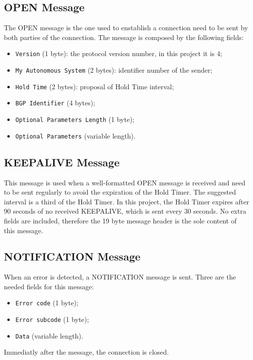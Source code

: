 \subsection{OPEN Message}
The OPEN message is the one used to enstablish a connection need to be sent by both parties of the connection.
The message is composed by the following fields:
\begin{itemize}
    \item \texttt{Version} (1 byte): the protocol version number, in this project it is 4;
    \item \texttt{My Autonomous System} (2 bytes): identifier number of the sender;
    \item \texttt{Hold Time} (2 bytes): proposal of Hold Time interval;
    \item \texttt{BGP Identifier} (4 bytes);
    \item \texttt{Optional Parameters Length} (1 byte);
    \item \texttt{Optional Parameters} (variable length).
\end{itemize}


\subsection{KEEPALIVE Message}
This message is used when a well-formatted OPEN message is received and need to be sent regularly to avoid the expiration of the Hold Timer. The suggested interval is a third of the Hold Timer. In this project, the Hold Timer expires after 90 seconds of no received KEEPALIVE, which is sent every 30 seconds. No extra fields are included, therefore the 19 byte message header is the sole content of this message.


\subsection{NOTIFICATION Message}
When an error is detected, a NOTIFICATION message is sent. Three are the needed fields for this message:
\begin{itemize}
    \item \texttt{Error code} (1 byte);
    \item \texttt{Error subcode} (1 byte);
    \item \texttt{Data} (variable length).
\end{itemize}
Immediatly after the message, the connection is closed.

